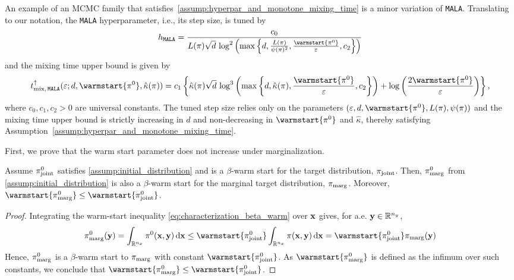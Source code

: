 \documentclass[onefignum,onetabnum]{siamonline250211}
\renewcommand{\d} {{\rm d}}                                %
\newcommand{\isocond}{\hat\kappa}
\newcommand{\bfx}{{\bf x}}
\newcommand{\bfy}{{\bf y}}
\newcommand{\bbR}{\mathbb{R}}
\newcommand{\nx}{{n_{x}}}
\newcommand{\ny}{{n_{y}}}
\newcommand{\pjoint}{\pi_{\rm joint}}
\newcommand{\pmarg}{\pi_{\rm marg}}
\newcommand{\MALA}{\textnormal{\texttt{MALA}}\xspace}
\begin{document}
An example of an MCMC family that satisfies~\ref{assump:hyperpar_and_monotone_mixing_time}
%
is a minor variation %
of \MALA \cite[Appendix D.1]{altschuler_faster_2024}.
Translating \cite[Theorem~3]{wu_minimax_2022} to our notation, the \MALA hyperparameter, i.e., its step size, is tuned by
\begin{equation*}
  \label{eq:weak-mala-example-step-size}
  h_{\MALA} = \frac{c_0}{L(\pi) \sqrt{d}\,\log^2\left( \max\left\{d,\frac{L(\pi)}{\psi(\pi)^2},\frac{\warmstart{\pi^0}}{\varepsilon},c_2\right\}\right)}
\end{equation*}
and the mixing time upper bound is given by
\begin{equation*}
  \label{eq:weak-mala-example-mixing-bound}
  t_{\rm mix,\, \MALA}^\uparrow(\varepsilon; d,\warmstart{\pi^0},\isocond(\pi))
  = c_1\left\{
      \isocond(\pi)\sqrt{d}\,\log^3\left( \max\left\{d, \isocond(\pi),\frac{\warmstart{\pi^0}}{\varepsilon},c_2\right\}\right)
      + \log\left(\frac{2\warmstart{\pi^0}}{\varepsilon}\right)
    \right\},
\end{equation*}
where $c_0, c_1, c_2 > 0$ are universal constants.
The tuned step size relies only on the parameters $(\varepsilon,d,\warmstart{\pi^0},L(\pi),\psi(\pi))$ and the mixing time upper bound is strictly increasing in $d$ and non-decreasing in $\warmstart{\pi^0}$ and $\isocond$, thereby satisfying Assumption~\ref{assump:hyperpar_and_monotone_mixing_time}.%


First, we prove that the warm start parameter does not increase under marginalization.
%
\begin{lemma}
\label{lem:warm_start_preserved}
	Assume $\pjoint^0$ satisfies \ref{assump:initial_distribution} and is a $\beta$-warm start for the target distribution, $\pjoint$.
	Then, $\pmarg^0$ from \ref{assump:initial_distribution} is also a $\beta$-warm start for the marginal target distribution, $\pmarg$.
    Moreover, $\warmstart{\pmarg^0} \leq \warmstart{\pjoint^0}$.
\end{lemma}

%
%
%
%

\begin{proof}%
Integrating the warm-start inequality \eqref{eq:characterization_beta_warm} over $\bfx$ gives, for a.e. $\bfy \in \bbR^\ny$,
\[
    \pmarg^0(\bfy)
    = \int_{\bbR^\nx} \pi^0(\bfx,\bfy)\,\d\bfx
    \leq \warmstart{\pjoint^0} \int_{\bbR^\nx} \pi(\bfx,\bfy)\,\d\bfx
    = \warmstart{\pjoint^0} \pmarg(\bfy)
\]
Hence, $\pmarg^0$ is a $\beta$-warm start to $\pmarg$ with constant $\warmstart{\pjoint^0}$.
As $\warmstart{\pmarg^0}$ is defined as the infimum over such constants, we conclude that $\warmstart{\pmarg^0} \leq \warmstart{\pjoint^0}$.
\end{proof}
\end{document}
